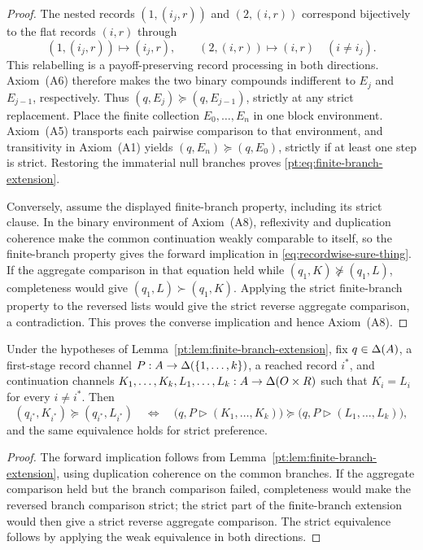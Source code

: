 \begin{proof}
The nested records $(1,(i_j,r))$ and $(2,(i,r))$ correspond bijectively to the flat records $(i,r)$ through
\[
 (1,(i_j,r))\longmapsto(i_j,r),
 \qquad
 (2,(i,r))\longmapsto(i,r)\quad(i\ne i_j).
\]
This relabelling is a payoff-preserving record processing in both directions.  Axiom~\textup{(A6)} therefore
makes the two binary compounds indifferent to $E_j$ and $E_{j-1}$, respectively.  Thus
$(q,E_j)\succeq(q,E_{j-1})$, strictly at any strict replacement.  Place the finite collection
$E_0,\ldots,E_n$ in one block environment.  Axiom~\textup{(A5)} transports each pairwise comparison to that
environment, and transitivity in Axiom~\textup{(A1)} yields $(q,E_n)\succeq(q,E_0)$, strictly if at least one
step is strict.  Restoring the immaterial null branches proves \eqref{pt:eq:finite-branch-extension}.

Conversely, assume the displayed finite-branch property, including its strict clause.  In the binary environment
of Axiom~\textup{(A8)}, reflexivity and duplication coherence make the common continuation weakly comparable to
itself, so the finite-branch property gives the forward implication in
\eqref{eq:recordwise-sure-thing}.  If the aggregate comparison in that equation held while
$(q_1,K)\not\succeq(q_1,L)$, completeness would give $(q_1,L)\succ(q_1,K)$.  Applying the strict
finite-branch property to the reversed lists would give the strict reverse aggregate comparison, a contradiction.  This
proves the converse implication and hence Axiom~\textup{(A8)}.
\end{proof}

\begin{corollary}\label{pt:cor:one-branch-a8}
Under the hypotheses of Lemma~\ref{pt:lem:finite-branch-extension}, fix $q\in\Delta(A)$, a first-stage record channel
$P:A\to\Delta(\{1,\ldots,k\})$, a reached record $i^*$, and continuation channels
$K_1,\ldots,K_k,L_1,\ldots,L_k:A\to\Delta(O\times R)$ such that $K_i=L_i$ for every $i\ne i^*$.  Then
\[
 (q_{i^*},K_{i^*})\succeq(q_{i^*},L_{i^*})
 \quad\Longleftrightarrow\quad
 \bigl(q,P\triangleright(K_1,\ldots,K_k)\bigr)
 \succeq
 \bigl(q,P\triangleright(L_1,\ldots,L_k)\bigr),
\]
and the same equivalence holds for strict preference.
\end{corollary}

\begin{proof}
The forward implication follows from Lemma~\ref{pt:lem:finite-branch-extension}, using duplication coherence on
the common branches.  If the aggregate comparison held but the branch comparison failed, completeness would make
the reversed branch comparison strict; the strict part of the finite-branch extension would then give a strict
reverse aggregate comparison.  The strict equivalence follows by applying the weak equivalence in both directions.
\end{proof}

